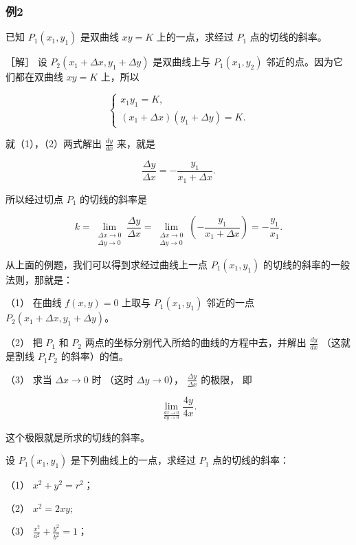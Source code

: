 \subsubsection{例2}\label{ux4f8b2-27}

已知 \(P_{1}(x_{1},y_{1})\) 是双曲线 \(xy = K\) 上的一点，求经过
\(P_{1}\) 点的切线的斜率。

［解］ 设 \(P_{2}(x_{1} + \Delta x, y_{1} + \Delta y)\) 是双曲线上与
\(P_{1}(x_{1}, y_{2})\) 邻近的点。因为它们都在双曲线 \(xy = K\) 上，所以

\[
\left\{ \begin{array}{l} x_{1} y_{1} = K, \\ (x_{1} + \Delta x) (y_{1} + \Delta y) = K. \end{array} \right. \tag {1}
\]

就（1），（2）两式解出 \(\frac{dy}{dx}\) 来，就是

\[
\frac {\Delta y}{\Delta x} = - \frac {y_{1}}{x_{1} + \Delta x}.
\]

所以经过切点 \(P_{1}\) 的切线的斜率是

\[
k = \lim _ {\substack {\Delta x \rightarrow 0\\\Delta y \rightarrow 0}} \frac {\Delta y}{\Delta x} = \lim _ {\substack {\Delta x \rightarrow 0\\\Delta y \rightarrow 0}} \left(- \frac {y_{1}}{x_{1} + \Delta x}\right) = - \frac {y_{1}}{x_{1}}.
\]

从上面的例题，我们可以得到求经过曲线上一点 \(P_{1}(x_{1},y_{1})\)
的切线的斜率的一般法则，那就是：

（1） 在曲线 \(f(x, y) = 0\) 上取与 \(P_{1}(x_{1}, y_{1})\) 邻近的一点
\(P_{2}(x_{1} + \Delta x, y_{1} + \Delta y)\)。

（2） 把 \(P_{1}\) 和 \(P_{2}\)
两点的坐标分别代入所给的曲线的方程中去，并解出 \(\frac{dy}{dx}\)
（这就是割线 \(P_{1}P_{2}\) 的斜率）的值。

（3） 求当 \(\Delta x \to 0\) 时 （这时 \(\Delta y \to 0\)），
\(\frac{\Delta y}{\Delta x}\) 的极限， 即

\[
\lim_ {\frac {d x \rightarrow 0}{d y \rightarrow 0}} \frac {4 y}{4 x}.
\]

这个极限就是所求的切线的斜率。

设 \(P_{1}(x_{1},y_{1})\) 是下列曲线上的一点，求经过 \(P_{1}\)
点的切线的斜率：

（1） \(x^{2} + y^{2} = r^{2}\)；

（2） \(x^{2} = 2xy;\)

（3） \(\frac{x^2}{a^2} + \frac{y^2}{b^2} = 1\)；

